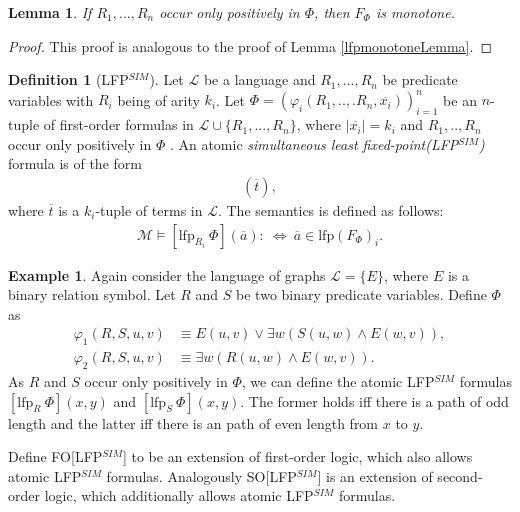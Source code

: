 \documentclass[acmsmall]{acmart}
\theoremstyle{plain}
\newtheorem{lemma}[theorem]{Lemma}
\theoremstyle{definition}
\newtheorem{definition}[theorem]{Definition}
\newtheorem{example}[theorem]{Example}
\newcommand{\calL}{\mathcal{L}}
\newcommand{\calM}{\mathcal{M}}
\newcommand{\mybar}[1]{\overline{#1}}
\newcommand{\lfp}{\mathrm{lfp}} %
\begin{document}
\begin{lemma}\label{lfpSimmonotone}
	If $R_1,...,R_n$ occur only positively in $\Phi$, then $F_{\Phi}$ is monotone.
\end{lemma}
\begin{proof}
	This proof is analogous to the proof of Lemma \ref{lfpmonotoneLemma}.
\end{proof}

\begin{definition}[LFP$^{SIM}$]
	Let $\calL$ be a language and $R_1,...,R_n$ be predicate variables with $R_i$ being of arity $k_i$. Let  $\Phi = (\varphi_i(R_1,..,.R_n,\mybar{x_i}))_{i=1}^n$ be an $n$-tuple of first-order formulas in  $\calL \cup \{R_1,...,R_n\}$, where $|\mybar{x_i}| = k_i$ and $R_1,..,R_n$ occur only positively in $\Phi$ .
	An atomic \emph{simultaneous least fixed-point(LFP$^{SIM}$)} formula is of the form
	\begin{align*}
		[\lfp_{R_i} ~\Phi](\mybar{t}), 
	\end{align*}
 where $\mybar{t}$ is a $k_i$-tuple of terms in $\calL$.
	The semantics is defined as follows:
	\begin{align*}
		\calM \models [\lfp_{R_i} ~\Phi](\mybar{a}) :~\Leftrightarrow~ \mybar{a} \in \lfp(F_{\Phi})_i.
	\end{align*}
\end{definition}

\begin{example}
	Again consider the language of graphs $\calL = \{E\}$, where $E$ is a binary relation symbol. Let $R$ and $S$ be two binary predicate variables. Define $\Phi$ as
	\begin{align*}
		\varphi_1(R,S,u,v) &\equiv E(u,v) \vee \exists w (S(u,w) \wedge E(w,v)),\\
		\varphi_2(R,S,u,v) &\equiv \exists w (R(u,w) \wedge E(w,v)).
	\end{align*}
	As $R$ and $S$ occur only positively in $\Phi$, we can define the atomic LFP$^{SIM}$ formulas $[\lfp_R ~\Phi](x,y)$ and $[\lfp_S ~\Phi](x,y)$. The former holds iff there is a path of odd length and the latter iff there is an path of even length from $x$ to $y$.
\end{example}

Define FO[LFP$^{SIM}$] to be an extension of first-order logic, which also allows atomic LFP$^{SIM}$ formulas. Analogously SO[LFP$^{SIM}$] is an extension of second-order logic, which additionally allows atomic LFP$^{SIM}$ formulas.
\end{document}
